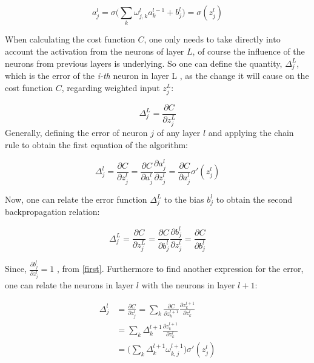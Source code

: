 \begin{equation}
a_j^l = \sigma\bigg(\sum_{k}\omega_{j,k}^l a_k^{l-1} + b_j^{l} \bigg) = \sigma(z_j^l)
\label{first}
\end{equation}

When calculating the cost function $C$, one only needs to take directly into account the activation from the neurons of layer $L$, of course the influence of the neurons from previous layers is underlying. So one can define the quantity, $ \Delta_j^L$, which is the error of the \textit{i-th} neuron in layer L , as the change it will cause on the cost function $C$, regarding weighted input $z_j^L$:

\begin{equation}
\Delta_j^L = \frac{\partial C}{\partial z_j^L}
\end{equation}
Generally, defining the error of neuron $j$ of any layer $l$ and applying the chain rule to obtain the first equation of the algorithm:

\begin{equation}
\Delta_j^l = \frac{\partial C}{\partial z_j^l} =  \frac{\partial C}{\partial a_j^l} \frac{\partial a_j^l}{\partial z_j^l} =  \frac{\partial C}{\partial a_j^l} \sigma '(z_j^l)
\label{backprop1}
\end{equation}

Now, one can relate the error function $ \Delta_j^L$ to the bias $b_j^{l}$ to obtain the second backpropagation relation:

\begin{equation}
\Delta_j^L = \frac{\partial C}{\partial z_j^L} = \frac{\partial C}{\partial b_j^l} \frac{\partial b_j^l}{\partial z_j^l} = \frac{\partial C}{\partial b_j^l}
\label{backprop2}
\end{equation}

Since, $\frac{\partial b_j^l}{\partial z_j^l} = 1$ , from \ref{first}. 
Furthermore to find another expression for the error, one can relate the neurons in layer $l$ with the neurons in layer $l+1$: 

\begin{align}
\Delta_j^l &= \frac{\partial C}{\partial z_j^l} = \sum_k \frac{\partial C}{\partial z_k^{l+1}} \frac{\partial z_k^{l+1}}{\partial z_k^{l}} \\
&= \sum_k  \Delta_k^{l+1}  \frac{\partial z_k^{l+1}}{\partial z_k^{l}} \\
&= \bigg( \sum_k  \Delta_k^{l+1} \omega_{k,j}^{l+1}\bigg) \sigma '(z_j^l)
\label{backprop3}
\end{align}


